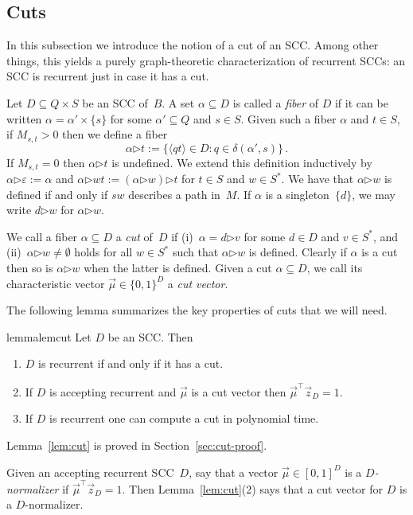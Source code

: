 \documentclass{elsarticle}
\def\<{\langle}
\def\>{\rangle}
\newcommand{\then}{\mathord{\triangleright}}
\begin{document}
\subsection{Cuts}
\label{sub:cut}
In this subsection we introduce the notion of a cut of an SCC.
Among other things, this yields a purely graph-theoretic
characterization of recurrent SCCs: an SCC is recurrent just in case
it has a cut.

Let $D \subseteq Q \times S$ be an SCC of~$B$.  A set
$\alpha \subseteq D$ is called a \emph{fiber} of $D$ if it can be
written $\alpha=\alpha'\times\{s\}$ for some $\alpha'\subseteq Q$ and
$s\in S$.  Given such a fiber $\alpha$ and $t \in S$, if $M_{s,t}>0$
then we define a fiber
\[ \alpha\then t := \{ \<q t\> \in D : q \in \delta(\alpha',s) \} \,
  . \] If $M_{s,t}=0$ then $\alpha\then t$ is undefined.  We extend
this definition inductively by
$\alpha \then \varepsilon := \alpha$ and
$\alpha \then w t := (\alpha\then w)\then t$ for $t \in S$ and
$w \in S^*$.
We have that $\alpha \then w$ is defined if and only if $s w$ describes a path in~$M$.
If $\alpha$ is a singleton~$\{d\}$, we may write $d \then w$ for $\alpha \then w$.


  We call a fiber $\alpha \subseteq D$ a \emph{cut} of~$D$ if
  (i)~$\alpha = d \then v$ for some $d \in D$ and $v \in S^*$,
  and (ii)~$\alpha\then w \neq \emptyset$ holds for all $w\in S^*$ such that
  $\alpha\then w$ is defined.
Clearly if $\alpha$ is a cut then so is $\alpha\then w$ when the
latter is defined.  Given a cut $\alpha\subseteq D$, we call its
characteristic vector $\vec{\mu} \in \{0,1\}^D$ a \emph{cut vector}.

The following lemma summarizes the key properties of cuts that we will need.\begin{restatable}{lemma}{lemcut}\label{lem:cut}\label{LEM:CUT}
Let $D$ be an SCC.  Then
\begin{enumerate}
\item $D$ is recurrent if and only if it has a cut.
\item If $D$ is accepting recurrent and $\vec{\mu}$ is a cut vector then $\vec{\mu}^\top \vec{z}_D=1$.
\item If $D$ is recurrent one can compute a cut in polynomial time.
\end{enumerate}
\end{restatable}
\noindent Lemma~\ref{lem:cut} is proved in Section~\ref{sec:cut-proof}.

Given an accepting recurrent SCC~$D$, say that a vector $\vec{\mu} \in [0,1]^D$ is a
\emph{$D$-normalizer} if $\vec{\mu}^\top \vec{z}_D = 1$.  Then
Lemma~\ref{lem:cut}(2) says that a cut vector for $D$ is a
$D$-normalizer.
\end{document}
